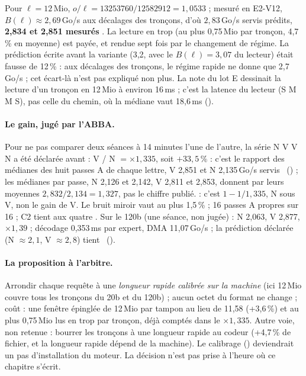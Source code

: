 Pour $\ell = 12$\,Mio, $o/\ell = \num{13253760} / \num{12582912} = 1{,}0533$ ; mesuré en E2-V12, $B(\ell) \approx 2{,}69$\,Go/s aux décalages des tronçons, d'où $2{,}83$\,Go/s servis prédits, \textbf{2,834 et 2,851 mesurés} \calc. La lecture en trop (au plus 0,75\,Mio par tronçon, 4,7\,\% en moyenne) est payée, et rendue sept fois par le changement de régime.  La prédiction écrite avant la variante (3,2, avec le $B(\ell) = 3{,}07$ du lecteur) était fausse de 12\,\% : aux décalages des tronçons, le régime rapide ne donne que 2,7\,Go/s ; cet écart-là n'est pas expliqué non plus.  La note du lot E dessinait la lecture d'un tronçon en 12\,Mio à environ 16\,ms ; c'est la latence du lecteur (S M M S), pas celle du chemin, où la médiane vaut 18,6\,ms ().

\paragraph{Le gain, jugé par l'ABBA.} Pour ne pas comparer deux séances à 14 minutes l'une de l'autre, la série N V V N a été déclarée avant : V / N $= \times 1{,}335$, soit $+33{,}5\,\%$ : c'est le rapport des médianes des huit passes A de chaque lettre, V 2,851 et N 2,135\,Go/s servis \calc~() ; les médianes par passe, N 2,126 et 2,142, V 2,811 et 2,853, donnent par leurs moyennes $2{,}832 / 2{,}134 = 1{,}327$, pas le chiffre publié.  : c'est $1 - 1/1{,}335$, N sous V, non le gain de V. Le bruit miroir vaut au plus 1,5\,\% ; 16 passes A propres sur 16 ; C2 tient aux quatre \mes. Sur le 120b (une séance, non jugée) : N 2,063, V 2,877, $\times 1{,}39$ ; décodage 0,353\,ms par expert, DMA 11,07\,Go/s ; la prédiction déclarée (N $\approx 2{,}1$, V $\approx 2{,}8$) tient \mes~().

\paragraph{La proposition à l'arbitre.} Arrondir chaque requête à une \emph{longueur rapide calibrée sur la machine} (ici 12\,Mio couvre tous les tronçons du 20b et du 120b) ; aucun octet du format ne change ; coût : une fenêtre épinglée de 12\,Mio par tampon au lieu de 11,58 (+3,6\,\%) et au plus 0,75\,Mio lus en trop par tronçon, déjà comptés dans le $\times 1{,}335$. Autre voie, non retenue : bourrer les tronçons à une longueur rapide au codeur (+4,7\,\% de fichier, et la longueur rapide dépend de la machine). Le calibrage () deviendrait un pas d'installation du moteur. La décision n'est pas prise à l'heure où ce chapitre s'écrit.

